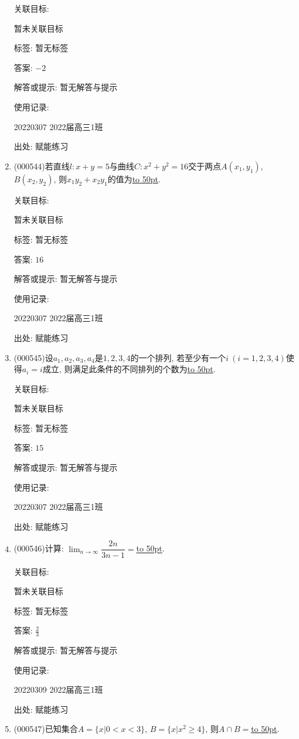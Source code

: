 \documentclass[10pt,a4paper]{article}
\newcommand{\blank}[1]{\underline{\hbox to #1pt{}}}
\begin{document}
\begin{enumerate}[1.]
关联目标:

暂未关联目标



标签: 暂无标签

答案: $-2$

解答或提示: 暂无解答与提示

使用记录:

20220307	2022届高三1班	


出处: 赋能练习
\item { (000544)}若直线$l:x+y=5$与曲线$C:x^2+y^2=16$交于两点$A(x_1,y_1)$, $B(x_2,y_2)$, 则$x_1y_2+x_2y_1$的值为\blank{50}.


关联目标:

暂未关联目标



标签: 暂无标签

答案: $16$

解答或提示: 暂无解答与提示

使用记录:

20220307	2022届高三1班	


出处: 赋能练习
\item { (000545)}设$a_1,a_2,a_3,a_4$是$1,2,3,4$的一个排列, 若至少有一个$i\ (i=1,2,3,4)$使得$a_i=i$成立, 则满足此条件的不同排列的个数为\blank{50}.


关联目标:

暂未关联目标



标签: 暂无标签

答案: $15$

解答或提示: 暂无解答与提示

使用记录:

20220307	2022届高三1班	


出处: 赋能练习
\item { (000546)}计算: $\displaystyle\lim_{n\to\infty}\dfrac{2n}{3n-1}=$\blank{50}.


关联目标:

暂未关联目标



标签: 暂无标签

答案: $\frac 23$

解答或提示: 暂无解答与提示

使用记录:

20220309	2022届高三1班	


出处: 赋能练习
\item { (000547)}已知集合$A=\{x|0<x<3\}$, $B=\{x|x^2\ge 4\}$, 则$A\cap B=$\blank{50}.



\end{enumerate}
\end{document}
